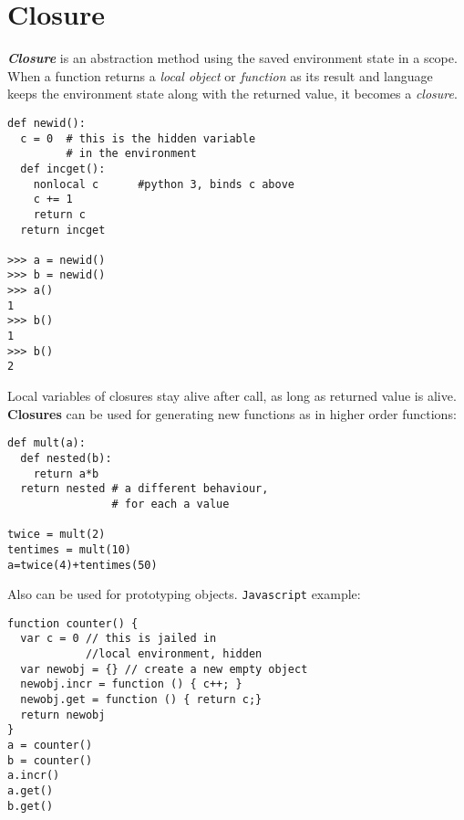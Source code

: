 \section{Closure}
\label{sec:closure}

\textit{\textbf{Closure}} is an abstraction method using the saved environment state in a scope. When a function returns a \textit{local object} or \textit{function} as its result and language keeps the environment state along with the returned value, it becomes a \textit{closure}.

\begin{listing}[H]

\begin{verbatim}
def newid():
  c = 0  # this is the hidden variable 
         # in the environment
  def incget():
    nonlocal c      #python 3, binds c above
    c += 1
    return c
  return incget

>>> a = newid()
>>> b = newid()
>>> a()
1
>>> b()
1
>>> b()
2
\end{verbatim}

\caption{}
\label{code:code4}
\end{listing}

\vspace*{\fill}
\columnbreak

Local variables of closures stay alive after call, as long as returned value is alive. \textbf{Closures} can be used for generating new functions as in higher order functions:
\begin{listing}[H]

\begin{verbatim}
def mult(a):
  def nested(b):
    return a*b
  return nested # a different behaviour,
                # for each a value

twice = mult(2)
tentimes = mult(10)
a=twice(4)+tentimes(50)
\end{verbatim}

\caption{}
\label{code:code5}
\end{listing}

\noindent Also can be used for prototyping objects. \texttt{Javascript} example:
\begin{listing}[H]

\begin{verbatim}
function counter() {
  var c = 0 // this is jailed in 
            //local environment, hidden
  var newobj = {} // create a new empty object
  newobj.incr = function () { c++; }
  newobj.get = function () { return c;}
  return newobj
}
a = counter()
b = counter()
a.incr()
a.get()
b.get()  
\end{verbatim}

\caption{}
\label{code:code6}
\end{listing}

